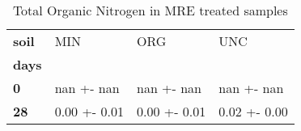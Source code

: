 \begin{table}
\centering
\caption{Total Organic Nitrogen in MRE treated samples}
\label{<built-in method lower of str object at 0x7f271a5cf298>_treated_main}
\begin{tabular}{llll}
\toprule
\textbf{soil} &           MIN &           ORG &           UNC \\
\textbf{days} &               &               &               \\
\midrule
\textbf{0   } &    nan +- nan &    nan +- nan &    nan +- nan \\
\textbf{28  } &  0.00 +- 0.01 &  0.00 +- 0.01 &  0.02 +- 0.00 \\
\bottomrule
\end{tabular}
\end{table}
